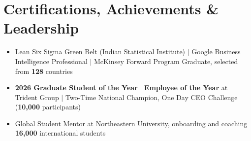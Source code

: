 \documentclass[letterpaper,10pt]{article}
\newcommand{\resumeItem}[1]{\item{#1 \vspace{-1pt}}}
\newcommand{\resumeItemListStart}{\begin{itemize}[leftmargin=0.15in, label=$\bullet$]}
\newcommand{\resumeItemListEnd}{\end{itemize}\vspace{-2pt}}
\begin{document}
\section{Certifications, Achievements \& Leadership}
\resumeItemListStart
\resumeItem{Lean Six Sigma Green Belt (Indian Statistical Institute) $|$ Google Business Intelligence Professional $|$ McKinsey Forward Program Graduate, selected from \textbf{128} countries}
\resumeItem{\textbf{2026 Graduate Student of the Year} $|$ \textbf{Employee of the Year} at Trident Group $|$ Two-Time National Champion, One Day CEO Challenge (\textbf{10,000} participants)}
\resumeItem{Global Student Mentor at Northeastern University, onboarding and coaching \textbf{16,000} international students}
\resumeItemListEnd
\end{document}
